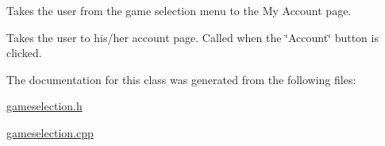 \-Takes the user from the game selection menu to the \-My \-Account page. 

\-Takes the user to his/her account page. \-Called when the \char`\"{}\-Account\char`\"{} button is clicked. 

\-The documentation for this class was generated from the following files\-:\begin{DoxyCompactItemize}
\item 
\hyperlink{gameselection_8h}{gameselection.\-h}\item 
\hyperlink{gameselection_8cpp}{gameselection.\-cpp}\end{DoxyCompactItemize}
